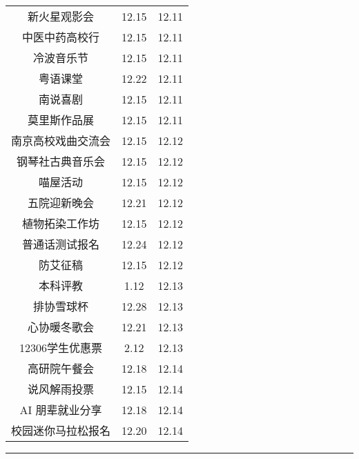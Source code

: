 \documentclass[letterpaper, 12pt]{article}
\begin{document}
\begin{multicols}{2}
{\begin{longtable}{|c|c|c|}
    新火星观影会 & 12.15 & 12.11\\
    中医中药高校行 & 12.15 & 12.11\\
    冷波音乐节 & 12.15 & 12.11\\
    粤语课堂 & 12.22 & 12.11\\
    南说喜剧 & 12.15 & 12.11\\
    莫里斯作品展 & 12.15 & 12.11\\
    南京高校戏曲交流会 & 12.15 & 12.12\\
    钢琴社古典音乐会 & 12.15 & 12.12\\
    喵屋活动 & 12.15 & 12.12\\
    五院迎新晚会 & 12.21 & 12.12\\
    植物拓染工作坊 & 12.15 & 12.12\\
    普通话测试报名 & 12.24 & 12.12\\
    防艾征稿 & 12.15 & 12.12\\
    本科评教 & 1.12 & 12.13\\
    排协雪球杯 & 12.28 & 12.13\\
    心协暖冬歌会 & 12.21 & 12.13\\
    12306学生优惠票 & 2.12 & 12.13\\
    高研院午餐会 & 12.18 & 12.14\\
    说风解雨投票 & 12.15 & 12.14\\
    AI 朋辈就业分享 & 12.18 & 12.14\\
    校园迷你马拉松报名 & 12.20 & 12.14\\
    \hline
\end{longtable}
\unskip
\unpenalty
\unpenalty}\unvbox\colbbox
\end{multicols}
\hrule
\pagebreak
\end{document}
